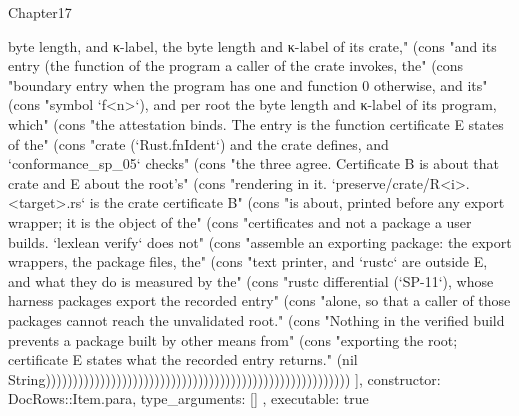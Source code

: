 \begin{lexlean}{Chapter17}
\begin{semanticmodule}
{{byte length, and κ-label, the byte length and κ-label of its crate," (cons "and its entry (the function of the program a caller of the crate invokes, the" (cons "boundary entry when the program has one and function 0 otherwise, and its" (cons "symbol `f<n>`), and per root the byte length and κ-label of its program, which" (cons "the attestation binds. The entry is the function certificate E states of the" (cons "crate (`Rust.fnIdent`) and the crate defines, and `conformance_sp_05` checks" (cons "the three agree. Certificate B is about that crate and E about the root's" (cons "rendering in it. `preserve/crate/R<i>.<target>.rs` is the crate certificate B" (cons "is about, printed before any export wrapper; it is the object of the" (cons "certificates and not a package a user builds. `lexlean verify` does not" (cons "assemble an exporting package: the export wrappers, the package files, the" (cons "text printer, and `rustc` are outside E, and what they do is measured by the" (cons "rustc differential (`SP-11`), whose harness packages export the recorded entry" (cons "alone, so that a caller of those packages cannot reach the unvalidated root." (cons "Nothing in the verified build prevents a package built by other means from" (cons "exporting the root; certificate E states what the recorded entry returns." (nil String))))))))))))))))))))))))))))))))))))))))))))))))))))))))
    ],
    constructor: DocRows::Item.para,
    type_arguments: []
  },
  executable: true
}


\end{semanticmodule}
\end{lexlean}
